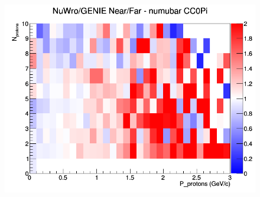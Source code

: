 \documentclass[12pt]{article}
\begin{document}
\begin{figure}[h]
\endminipage
{}
\includegraphics[width=\linewidth]{N_P/nominal/protons/ratios/CC0Pi_NuWro_GENIE_numubar_NF_N_P.png}
\endminipage
\newline
\end{figure}
\clearpage
\end{document}

